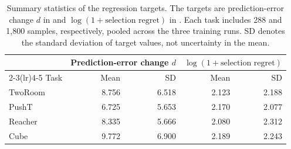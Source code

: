 \begin{table}[H]
\centering
\caption{Summary statistics of the regression targets. The targets are
prediction-error change $d$ in  and
$\log(1+\text{selection regret})$ in .
Each task includes 288 and 1,800 samples, respectively, pooled across the
three training runs. SD denotes the standard deviation of target values,
not uncertainty in the mean.}
\label{tab:regression-target-scales}
\small
\begin{tabular}{lrrrr}
\toprule
& \multicolumn{2}{c}{Prediction-error change $d$}
& \multicolumn{2}{c}{$\log(1+\text{selection regret})$} \\
\cmidrule(lr){2-3}\cmidrule(lr){4-5}
Task & Mean & SD & Mean & SD \\
\midrule
TwoRoom & 8.756 & 6.518 & 2.123 & 2.188 \\
PushT & 6.725 & 5.653 & 2.170 & 2.077 \\
Reacher & 8.335 & 5.666 & 2.080 & 2.312 \\
Cube & 9.772 & 6.900 & 2.189 & 2.243 \\
\bottomrule
\end{tabular}
\end{table}

